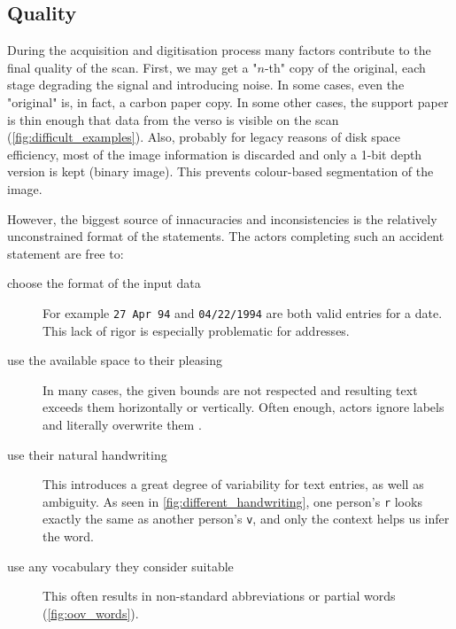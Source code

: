

\subsection{Quality}

	During the acquisition and digitisation process many factors contribute to the final quality of the scan. First, we may get a "$n$-th" copy of the original, each stage degrading the signal and introducing noise. In some cases, even the "original" is, in fact, a carbon paper copy. In some other cases, the support paper is thin enough that data from the verso is visible on the scan (\autoref{fig:difficult_examples}). Also, probably for legacy reasons of disk space efficiency, most of the image information is discarded and only a 1-bit depth version is kept (binary image). This prevents colour-based segmentation of the image.

	However, the biggest source of innacuracies and inconsistencies is the relatively unconstrained format of the statements. The actors completing such an accident statement are free to:
	\begin{description}
		\item[choose the format of the input data] For example \texttt{27 Apr 94} and \texttt{04/22/1994} are both valid entries for a date. This lack of rigor is especially problematic for addresses.

		\item[use the available space to their pleasing] In many cases, the given bounds are not respected and resulting text exceeds them horizontally or vertically. Often enough, actors ignore labels and literally overwrite them .

		\item[use their natural handwriting] \label{itm:natural_handwriting} This introduces a great degree of variability for text entries, as well as ambiguity. As seen in \autoref{fig:different_handwriting}, one person's \texttt{r} looks exactly the same as another person's \texttt{v}, and only the context helps us infer the word.

		\item[use any vocabulary they consider suitable] This often results in non-standard abbreviations or partial words (\autoref{fig:oov_words}).
	\end{description}



